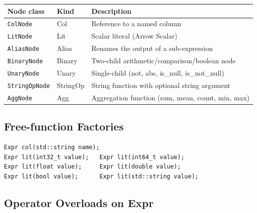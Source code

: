 \documentclass[12pt,a4paper]{article}
\begin{document}
\begin{center}
\begin{tabular}{lll}
\toprule
\textbf{Node class} & \textbf{Kind} & \textbf{Description} \\
\midrule
\texttt{ColNode}      & Col      & Reference to a named column \\
\texttt{LitNode}      & Lit      & Scalar literal (Arrow Scalar) \\
\texttt{AliasNode}    & Alias    & Renames the output of a sub-expression \\
\texttt{BinaryNode}   & Binary   & Two-child arithmetic/comparison/boolean node \\
\texttt{UnaryNode}    & Unary    & Single-child (not, abs, is\_null, is\_not\_null) \\
\texttt{StringOpNode} & StringOp & String function with optional string argument \\
\texttt{AggNode}      & Agg      & Aggregation function (sum, mean, count, min, max) \\
\bottomrule
\end{tabular}
\end{center}

\subsection{Free-function Factories}

\begin{lstlisting}
Expr col(std::string name);
Expr lit(int32_t value);   Expr lit(int64_t value);
Expr lit(float value);     Expr lit(double value);
Expr lit(bool value);      Expr lit(std::string value);
\end{lstlisting}

\subsection{Operator Overloads on Expr}
\end{document}
